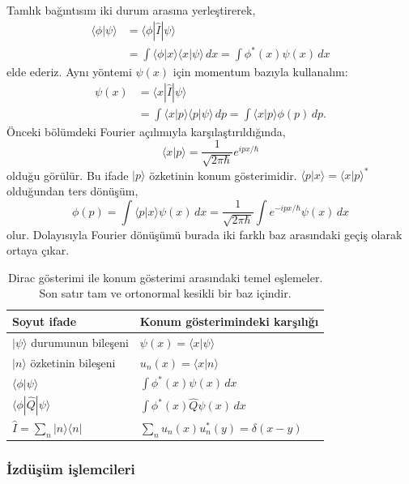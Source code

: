 \documentclass[00_kitap.tex]{subfiles}
\begin{document}
Tamlık bağıntısını iki durum arasına yerleştirerek,
\begin{align}
 \langle\phi|\psi\rangle
 &=\langle\phi|\hat I|\psi\rangle\\
 &=\int\langle\phi|x\rangle\langle x|\psi\rangle\,dx
 =\int\phi^*(x)\psi(x)\,dx
\end{align}
elde ederiz. Aynı yöntemi $\psi(x)$ için momentum bazıyla kullanalım:
\begin{align}
 \psi(x)&=\langle x|\hat I|\psi\rangle\\
 &=\int\langle x|p\rangle\langle p|\psi\rangle\,dp
 =\int\langle x|p\rangle\phi(p)\,dp.
\end{align}
Önceki bölümdeki Fourier açılımıyla karşılaştırıldığında,
\begin{equation}
 \boxed{\langle x|p\rangle
 =\frac{1}{\sqrt{2\pi\hbar}}e^{ipx/\hbar}}
 \label{eq:06_xp_cekirdek}
\end{equation}
olduğu görülür. Bu ifade $|p\rangle$ özketinin konum gösterimidir.
$\langle p|x\rangle=\langle x|p\rangle^*$ olduğundan ters dönüşüm,
\begin{equation}
 \phi(p)=\int\langle p|x\rangle\psi(x)\,dx
 =\frac{1}{\sqrt{2\pi\hbar}}\int e^{-ipx/\hbar}\psi(x)\,dx
\end{equation}
olur. Dolayısıyla Fourier dönüşümü burada iki farklı baz arasındaki
geçiş olarak ortaya çıkar.

\begin{table}[hbtp]
 \centering
 \begin{tabular}{ll}
 \hline
 Soyut ifade & Konum gösterimindeki karşılığı\\
 \hline
 $|\psi\rangle$ durumunun bileşeni & $\psi(x)=\langle x|\psi\rangle$\\
 $|n\rangle$ özketinin bileşeni & $u_n(x)=\langle x|n\rangle$\\
 $\langle\phi|\psi\rangle$ & $\displaystyle\int\phi^*(x)\psi(x)\,dx$\\[5pt]
 $\langle\phi|\hat Q|\psi\rangle$ & $\displaystyle\int\phi^*(x)\hat Q\psi(x)\,dx$\\[5pt]
 $\hat I=\sum_n|n\rangle\langle n|$ & $\displaystyle\sum_n u_n(x)u_n^*(y)=\delta(x-y)$\\[5pt]
 \hline
 \end{tabular}
 \caption{Dirac gösterimi ile konum gösterimi arasındaki temel
 eşlemeler. Son satır tam ve ortonormal kesikli bir baz içindir.}
 \label{tab:06_dirac_esleme}
\end{table}

\subsubsection{İzdüşüm işlemcileri}
\end{document}
